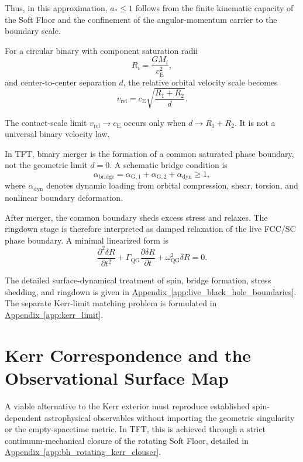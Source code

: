 Thus, in this approximation, $a_\ast \leq 1$ follows from the finite kinematic capacity of the Soft Floor and the confinement of the angular-momentum carrier to the boundary scale.

For a circular binary with component saturation radii
\begin{equation}
    R_i = \frac{GM_i}{c_{\mathrm{E}}^2},
\end{equation}
and center-to-center separation $d$, the relative orbital velocity scale becomes
\begin{equation}
    v_{\mathrm{rel}} = c_{\mathrm{E}} \sqrt{ \frac{R_1+R_2}{d} }.
\end{equation}

The contact-scale limit $v_{\mathrm{rel}}\rightarrow c_{\mathrm{E}}$ occurs only when $d\rightarrow R_1+R_2$. It is not a universal binary velocity law.

In TFT, binary merger is the formation of a common saturated phase boundary, not the geometric limit $d=0$. A schematic bridge condition is
\begin{equation}
    \alpha_{\mathrm{bridge}} = \alpha_{\mathrm{G},1} + \alpha_{\mathrm{G},2} + \alpha_{\mathrm{dyn}} \geq 1,
\end{equation}
where $\alpha_{\mathrm{dyn}}$ denotes dynamic loading from orbital compression, shear, torsion, and nonlinear boundary deformation.

After merger, the common boundary sheds excess stress and relaxes. The ringdown stage is therefore interpreted as damped relaxation of the live FCC/SC phase boundary. A minimal linearized form is
\begin{equation}
    \frac{\partial^2 \delta R}{\partial t^2} + \Gamma_{\mathrm{QG}} \frac{\partial \delta R}{\partial t} + \omega_{\mathrm{QG}}^2\delta R = 0.
\end{equation}

The detailed surface-dynamical treatment of spin, bridge formation, stress shedding, and ringdown is given in \hyperref[app:live_black_hole_boundaries]{Appendix~\ref*{app:live_black_hole_boundaries}}. The separate Kerr-limit matching problem is formulated in \hyperref[app:kerr_limit]{Appendix~\ref*{app:kerr_limit}}.

\section{Kerr Correspondence and the Observational Surface Map}

A viable alternative to the Kerr exterior must reproduce established spin-dependent astrophysical observables without importing the geometric singularity or the empty-spacetime metric. In TFT, this is achieved through a strict continuum-mechanical closure of the rotating Soft Floor, detailed in \hyperref[app:bh_rotating_kerr_clouser]{Appendix~\ref*{app:bh_rotating_kerr_clouser}}.


